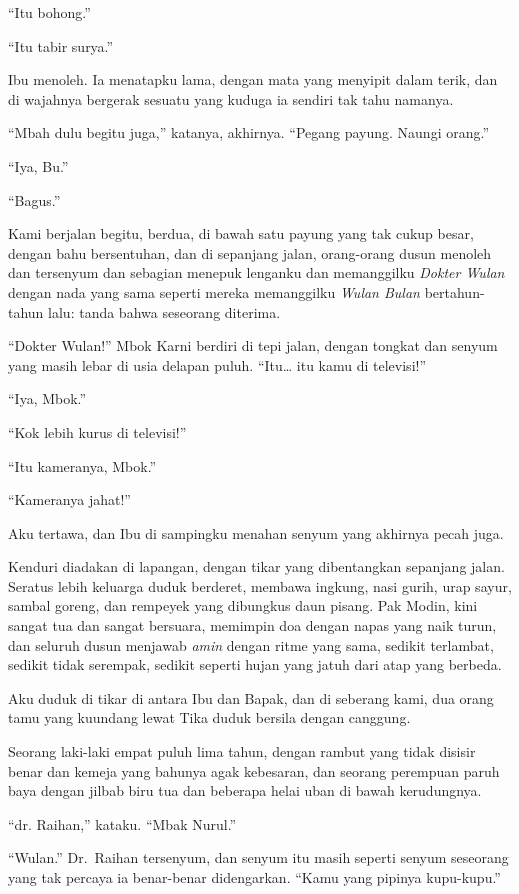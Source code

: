 \documentclass[11pt,twoside,openany]{book}
\makeatletter
\newcommand{\scenebreak}{\par\vspace{0.9em}{\centering\textsc{*\hspace{0.7em}*\hspace{0.7em}*}\par}\vspace{0.9em}\@afterindentfalse\@afterheading}
\makeatother
\begin{document}
``Itu bohong.''

``Itu tabir surya.''

Ibu menoleh. Ia menatapku lama, dengan mata yang menyipit dalam terik, dan di wajahnya bergerak sesuatu yang kuduga ia sendiri tak tahu namanya.

``Mbah dulu begitu juga,'' katanya, akhirnya. ``Pegang payung. Naungi orang.''

``Iya, Bu.''

``Bagus.''

Kami berjalan begitu, berdua, di bawah satu payung yang tak cukup besar, dengan bahu bersentuhan, dan di sepanjang jalan, orang-orang dusun menoleh dan tersenyum dan sebagian menepuk lenganku dan memanggilku \emph{Dokter Wulan} dengan nada yang sama seperti mereka memanggilku \emph{Wulan Bulan} bertahun-tahun lalu: tanda bahwa seseorang diterima.

``Dokter Wulan!'' Mbok Karni berdiri di tepi jalan, dengan tongkat dan senyum yang masih lebar di usia delapan puluh. ``Itu\ldots{} itu kamu di televisi!''

``Iya, Mbok.''

``Kok lebih kurus di televisi!''

``Itu kameranya, Mbok.''

``Kameranya jahat!''

Aku tertawa, dan Ibu di sampingku menahan senyum yang akhirnya pecah juga.

\scenebreak
Kenduri diadakan di lapangan, dengan tikar yang dibentangkan sepanjang jalan. Seratus lebih keluarga duduk berderet, membawa ingkung, nasi gurih, urap sayur, sambal goreng, dan rempeyek yang dibungkus daun pisang. Pak Modin, kini sangat tua dan sangat bersuara, memimpin doa dengan napas yang naik turun, dan seluruh dusun menjawab \emph{amin} dengan ritme yang sama, sedikit terlambat, sedikit tidak serempak, sedikit seperti hujan yang jatuh dari atap yang berbeda.

Aku duduk di tikar di antara Ibu dan Bapak, dan di seberang kami, dua orang tamu yang kuundang lewat Tika duduk bersila dengan canggung.

Seorang laki-laki empat puluh lima tahun, dengan rambut yang tidak disisir benar dan kemeja yang bahunya agak kebesaran, dan seorang perempuan paruh baya dengan jilbab biru tua dan beberapa helai uban di bawah kerudungnya.

``dr. Raihan,'' kataku. ``Mbak Nurul.''

``Wulan.'' Dr.~Raihan tersenyum, dan senyum itu masih seperti senyum seseorang yang tak percaya ia benar-benar didengarkan. ``Kamu yang pipinya kupu-kupu.''
\end{document}
